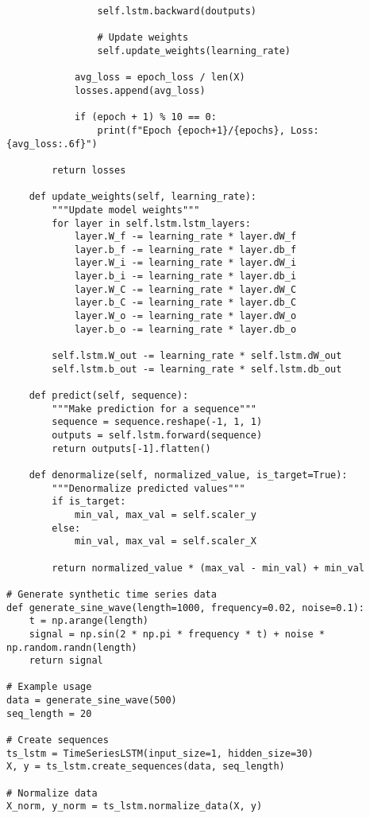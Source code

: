 ﻿\documentclass[12pt,a4paper]{article}
\begin{document}
\begin{lstlisting}
                self.lstm.backward(doutputs)
                
                # Update weights
                self.update_weights(learning_rate)
            
            avg_loss = epoch_loss / len(X)
            losses.append(avg_loss)
            
            if (epoch + 1) % 10 == 0:
                print(f"Epoch {epoch+1}/{epochs}, Loss: {avg_loss:.6f}")
        
        return losses
    
    def update_weights(self, learning_rate):
        """Update model weights"""
        for layer in self.lstm.lstm_layers:
            layer.W_f -= learning_rate * layer.dW_f
            layer.b_f -= learning_rate * layer.db_f
            layer.W_i -= learning_rate * layer.dW_i
            layer.b_i -= learning_rate * layer.db_i
            layer.W_C -= learning_rate * layer.dW_C
            layer.b_C -= learning_rate * layer.db_C
            layer.W_o -= learning_rate * layer.dW_o
            layer.b_o -= learning_rate * layer.db_o
        
        self.lstm.W_out -= learning_rate * self.lstm.dW_out
        self.lstm.b_out -= learning_rate * self.lstm.db_out
    
    def predict(self, sequence):
        """Make prediction for a sequence"""
        sequence = sequence.reshape(-1, 1, 1)
        outputs = self.lstm.forward(sequence)
        return outputs[-1].flatten()
    
    def denormalize(self, normalized_value, is_target=True):
        """Denormalize predicted values"""
        if is_target:
            min_val, max_val = self.scaler_y
        else:
            min_val, max_val = self.scaler_X
        
        return normalized_value * (max_val - min_val) + min_val

# Generate synthetic time series data
def generate_sine_wave(length=1000, frequency=0.02, noise=0.1):
    t = np.arange(length)
    signal = np.sin(2 * np.pi * frequency * t) + noise * np.random.randn(length)
    return signal

# Example usage
data = generate_sine_wave(500)
seq_length = 20

# Create sequences
ts_lstm = TimeSeriesLSTM(input_size=1, hidden_size=30)
X, y = ts_lstm.create_sequences(data, seq_length)

# Normalize data
X_norm, y_norm = ts_lstm.normalize_data(X, y)


\end{lstlisting}
\end{document}
